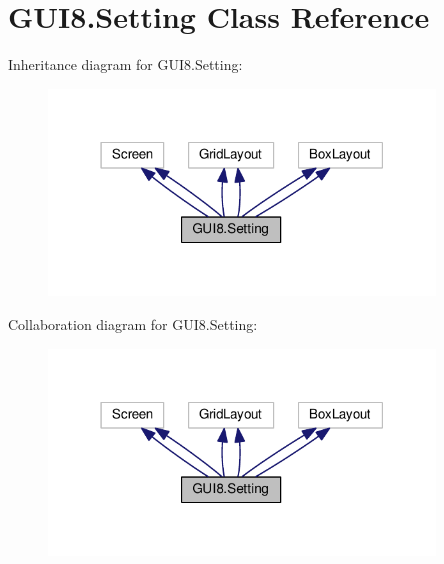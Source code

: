 \hypertarget{classGUI8_1_1Setting}{}\section{G\+U\+I8.\+Setting Class Reference}
\label{classGUI8_1_1Setting}


Inheritance diagram for G\+U\+I8.\+Setting\+:
\nopagebreak
\begin{figure}[H]
\begin{center}
\leavevmode
\includegraphics[width=291pt]{classGUI8_1_1Setting__inherit__graph}
\end{center}
\end{figure}


Collaboration diagram for G\+U\+I8.\+Setting\+:
\nopagebreak
\begin{figure}[H]
\begin{center}
\leavevmode
\includegraphics[width=291pt]{classGUI8_1_1Setting__coll__graph}
\end{center}
\end{figure}
